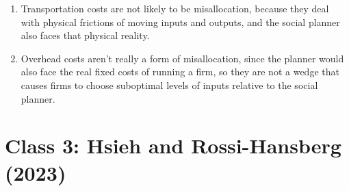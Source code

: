 \documentclass{article}
\begin{document}
\begin{enumerate}[label=(\alph*)]
    \item Transportation costs are not likely to be misallocation, because they deal with physical frictions of moving inputs and outputs, 
    and the social planner also faces that physical reality. 

    \item Overhead costs aren't really a form of misallocation, since the planner would also face the real fixed costs of running a firm, so they are not a wedge that causes firms to choose suboptimal levels of inputs relative to the social planner.
    
\end{enumerate}

\section*{Class 3: Hsieh and Rossi-Hansberg (2023)}
\end{document}
